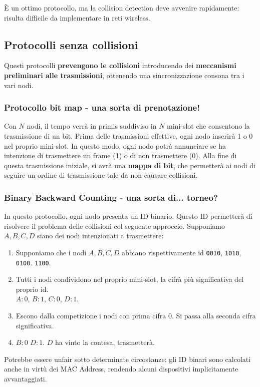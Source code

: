 È un ottimo protocollo, ma la collision detection deve avvenire rapidamente: risulta difficile da implementare in reti wireless.

\subsection{Protocolli senza collisioni}
Questi protocolli \textbf{prevengono le collisioni} introducendo dei \textbf{meccanismi preliminari alle trasmissioni}, ottenendo una sincronizzazione consona tra i vari nodi.

\subsubsection{Protocollo bit map - una sorta di prenotazione!}
Con $N$ nodi, il tempo verrà in primis suddiviso in $N$ mini-slot che consentono la trasmissione di un bit. Prima delle trasmissioni effettive, ogni nodo inserirà 1 o 0 nel proprio mini-slot. In questo modo, ogni nodo potrà annunciare se ha intenzione di trasmettere un frame (1) o di non trasmettere (0).
Alla fine di questa trasmissione iniziale, si avrà una \textbf{mappa di bit}, che permetterà ai nodi di seguire un ordine di trasmissione tale da non causare collisioni.

\subsubsection{Binary Backward Counting - una sorta di... torneo?}
In questo protocollo, ogni nodo presenta un ID binario. Questo ID permetterà di risolvere il problema delle collisioni col seguente approccio. Supponiamo $A,B,C,D$ siano dei nodi intenzionati a trasmettere:
\begin{enumerate}
	\item Supponiamo che i nodi $A,B,C,D$ abbiano rispettivamente id \verb|0010|, \verb|1010|, \verb|0100|. \verb|1100|.
	\item Tutti i nodi condividono nel proprio mini-slot, la cifrà più significativa del proprio id.\\
	$A:0$, $B:1$, $C:0$, $D:1$.
	\item Escono dalla competizione i nodi con prima cifra 0. Si passa alla seconda cifra significativa.
	\item $B:0$ $D:1$. $D$ ha vinto la contesa, trasmetterà.
\end{enumerate}

Potrebbe essere unfair sotto determinate circostanze: gli ID binari sono calcolati anche in virtù dei MAC Address, rendendo alcuni dispositivi implicitamente avvantaggiati.


